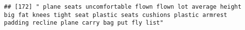 \documentclass[
]{article}
\begin{document}
\begin{verbatim}
## [172] " plane seats uncomfortable flown flown lot average height big fat knees tight seat plastic seats cushions plastic armrest padding recline plane carry bag put fly list"                                                                                                                                                                                                                                                                                                                                                                                                                                                                                                                                                                                                                                                                                                                                                                                                                                                                                                                                                                                                                                                                                                                                                                                                                                                                                                                                                                                                                                                                                                                                                                                                                        

\end{verbatim}
\end{document}
